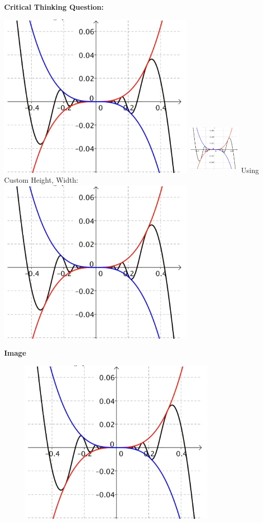 \documentclass[11pt, a4paper]{article}
\begin{document}
\textbf{Critical Thinking Question:}

\includegraphics[scale = 0.8]{limit2.png}
\vspace{1in}
\includegraphics[height = 1in, width = 1in]{limit2.png}
Using Custom Height, Width:
\vspace{1in}
\includegraphics[width = 0.5 \textwidth]{limit2.png}



\textbf{Image}
\begin{figure}[H]
    \includegraphics[scale=1]{limit2.png}
\end{figure}
\end{document}
